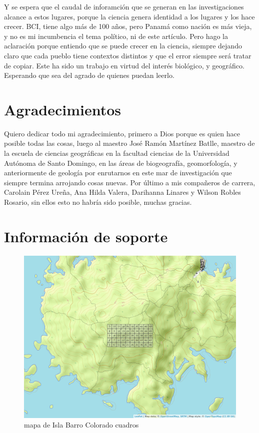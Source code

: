 \documentclass[11pt,]{article}
\begin{document}
Y se espera que el caudal de inforamción que se generan en las
investigaciones alcance a estos lugares, porque la ciencia genera
identidad a los lugares y los hace crecer. BCI, tiene algo más de 100
años, pero Panamá como nación es más vieja, y no es mi incumbencia el
tema político, ni de este artículo. Pero hago la aclaración porque
entiendo que se puede crecer en la ciencia, siempre dejando claro que
cada pueblo tiene contextos distintos y que el error siempre será tratar
de copiar. Este ha sido un trabajo en virtud del interés biológico, y
geográfico. Esperando que sea del agrado de quienes puedan leerlo.

\section{Agradecimientos}\label{agradecimientos}

Quiero dedicar todo mi agradecimiento, primero a Dios porque es quien
hace posible todas las cosas, luego al maestro José Ramón Martínez
Batlle, maestro de la escuela de ciencias geográficas en la facultad
ciencias de la Universidad Autónoma de Santo Domingo, en las áreas de
biogeografía, geomorfología, y anteriormente de geología por enrutarnos
en este mar de investigación que siempre termina arrojando cosas nuevas.
Por último a mis compañeros de carrera, Carolain Pérez Ureña, Ana Hilda
Valera, Darihanna Linares y Wilson Robles Rosario, sin ellos esto no
habría sido posible, muchas gracias.

\section{Información de soporte}\label{informaciuxf3n-de-soporte}

\begin{figure}
\centering
\includegraphics[width=1.00000\textwidth]{mapa_cuadros.png}
\caption{mapa de Isla Barro Colorado cuadros\label{fig:bci_map}}
\end{figure}
\end{document}
